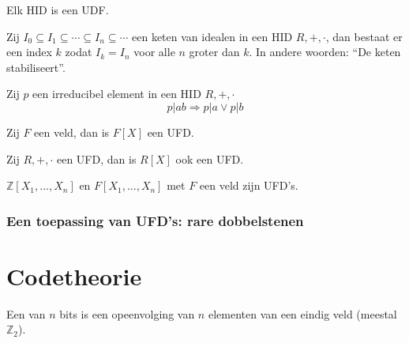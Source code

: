 \documentclass[main.tex]{subfiles}
\begin{document}
\begin{st}
  Elk HID is een UDF.
\end{st}

\begin{lem}
  Zij $I_{0} \subseteq I_{1} \subseteq \dotsb \subseteq I_{n} \subseteq \dotsb $ een keten van idealen in een HID $R,+,\cdot$, dan bestaat er een index $k$ zodat $I_{k} = I_{n}$ voor alle $n$ groter dan $k$.
  In andere woorden: ``De keten stabiliseert''.
\end{lem}

\begin{lem}
  Zij $p$ een irreducibel element in een HID $R,+,\cdot$
  \[ p|ab \Rightarrow p|a \vee p|b \]
\end{lem}

\begin{gev}
  Zij $F$ een veld, dan is $F[X]$ een UFD.
\end{gev}

\begin{st}
  Zij $R,+,\cdot$ een UFD, dan is $R[X]$ ook een UFD.
  \zb
\end{st}

\begin{gev}
  $\mathbb{Z}[X_{1},\dotsc,X_{n}]$ en $F[X_{1},\dotsc,X_{n}]$ met $F$ een veld zijn UFD's.
\end{gev}

\subsubsection{Een toepassing van UFD's: rare dobbelstenen}
\label{sec:een-toepassing-van-ufds}



\section{Codetheorie}
\label{sec:codetheorie}

\begin{de}
  Een  van $n$ bits is een opeenvolging van $n$ elementen van een eindig veld (meestal $\mathbb{Z}_{2}$).
\end{de}
\end{document}
